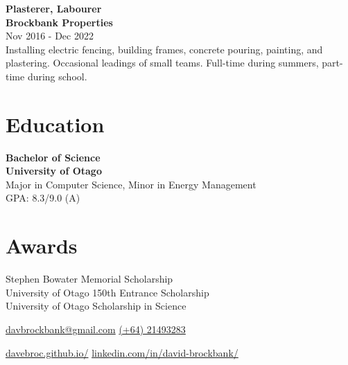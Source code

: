 \documentclass[lighthipster]{simplehipstercv}
\begin{document}
\begin{minipage}[t]{1\textwidth}
    \textbf{Plasterer, Labourer}\\
    \textbf{Brockbank Properties}\\
    Nov 2016 - Dec 2022\\
    Installing electric fencing, building frames, concrete pouring, painting, and plastering. Occasional leadings of small teams. Full-time during summers, part-time during school.\\
      
    \end{minipage}    
    \bigskip
    
    \begin{minipage}[t]{1\textwidth}
    \section*{Education}
    
    \textbf{Bachelor of Science}\\
    \textbf{University of Otago}\\
    Major in Computer Science, Minor in Energy Management\\
    GPA: 8.3/9.0 (A)\\
    
    \end{minipage}
    \bigskip
    
    \begin{minipage}[t]{1\textwidth}
    \section*{Awards}
    Stephen Bowater Memorial Scholarship\\
    University of Otago 150th Entrance Scholarship\\
    University of Otago Scholarship in Science
    \bigskip
    
    \end{minipage}\hfill
    \bigskip
    \bigskip
    \bigskip
    \bigskip
\setlength{\parindent}{0pt}

\begin{minipage}[t]{1\textwidth}
\fontfamily{\sfdefault}\selectfont \color{black!70}
{\begin{center}\small 
    \href{mailto:davbrockbank@gmail.com}{ davbrockbank@gmail.com}  
    \href{tel:021493283}{ (+64) 21493283}  
 \end{center}
\begin{center}
    \href{https://davebroc.github.io/}{davebroc.github.io/}
    \href{https://www.linkedin.com/in/david-brockbank/}{linkedin.com/in/david-brockbank/}
\end{center}
}
\end{minipage}
\end{document}
